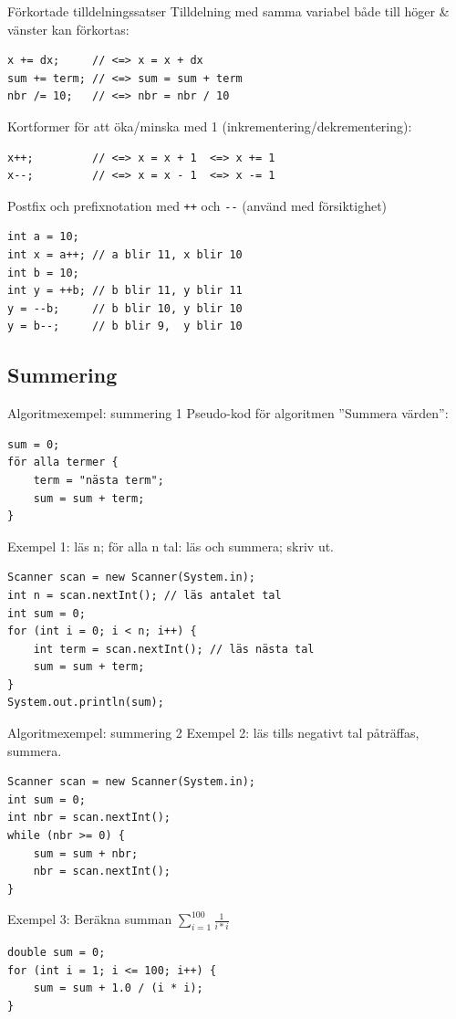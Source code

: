 \documentclass{lecturenotes}
\begin{document}
\begin{Slide}{Förkortade tilldelningssatser}\footnotesize
Tilldelning med samma variabel både till höger \& vänster kan förkortas:
\begin{lstlisting}
x += dx;     // <=> x = x + dx
sum += term; // <=> sum = sum + term
nbr /= 10;   // <=> nbr = nbr / 10
\end{lstlisting}

Kortformer för att öka/minska med 1 (inkrementering/dekrementering):
\begin{lstlisting}
x++;         // <=> x = x + 1  <=> x += 1
x--;         // <=> x = x - 1  <=> x -= 1
\end{lstlisting}
Postfix och prefixnotation med \texttt{++} och \verb+--+ (använd med försiktighet)
\begin{lstlisting}
int a = 10;
int x = a++; // a blir 11, x blir 10
int b = 10;
int y = ++b; // b blir 11, y blir 11
y = --b;     // b blir 10, y blir 10
y = b--;     // b blir 9,  y blir 10
\end{lstlisting}
\end{Slide}


\subsection{Summering}
\begin{Slide}{Algoritmexempel: summering 1}
Pseudo-kod för algoritmen ''Summera värden'':
\begin{lstlisting}
sum = 0;
för alla termer {
    term = "nästa term";
    sum = sum + term;
}
\end{lstlisting}

Exempel 1: läs n; för alla n tal: läs och summera; skriv ut.

\begin{lstlisting}
Scanner scan = new Scanner(System.in);
int n = scan.nextInt(); // läs antalet tal
int sum = 0;
for (int i = 0; i < n; i++) {
    int term = scan.nextInt(); // läs nästa tal
    sum = sum + term;
}
System.out.println(sum);
\end{lstlisting}
\end{Slide}

\begin{Slide}{Algoritmexempel: summering 2}
Exempel 2: läs tills negativt tal påträffas, summera.
\begin{lstlisting}
Scanner scan = new Scanner(System.in);
int sum = 0;
int nbr = scan.nextInt();
while (nbr >= 0) {
    sum = sum + nbr;
    nbr = scan.nextInt();
}
\end{lstlisting}
Exempel 3: Beräkna summan $\displaystyle\sum^{100}_{i=1}\frac{1}{i*i}$
\begin{lstlisting}
double sum = 0;
for (int i = 1; i <= 100; i++) {
    sum = sum + 1.0 / (i * i);
}
\end{lstlisting}
\end{Slide}
\end{document}
